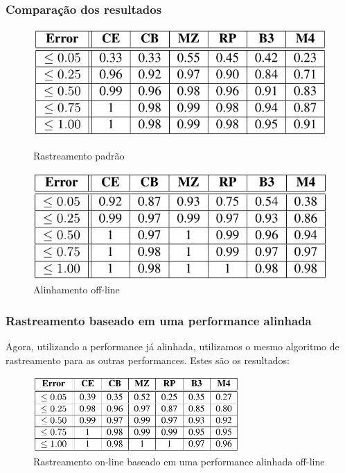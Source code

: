 \documentclass[serif,mathserif]{beamer}
\begin{document}
\begin{frame}
  \frametitle{Comparação dos resultados}

  \begin{figure}[!tbp]
    \centering
    \begin{minipage}[b]{0.45\textwidth}
      \includegraphics[width=\textwidth]{src/img/1-Table2-1.png}
      \caption*{Rastreamento padrão}
    \end{minipage}
    \hfill
    \begin{minipage}[b]{0.45\textwidth}
      \includegraphics[width=\textwidth]{src/img/1-Table3-1.png}
      \caption*{Alinhamento off-line}
    \end{minipage}
  \end{figure}
\end{frame}

\begin{frame}
  \frametitle{Rastreamento baseado em uma performance alinhada}
  Agora, utilizando a performance já alinhada, utilizamos o mesmo algoritmo de rastreamento para as outras performances.
  Estes são os resultados:
  \begin{figure}[!ht]
    \centering
    \includegraphics[width=0.7\textwidth]{src/img/3-Table4-1.png}
    \caption*{Rastreamento on-line baseado em uma performance alinhada off-line}
  \end{figure}
\end{frame}
\end{document}
